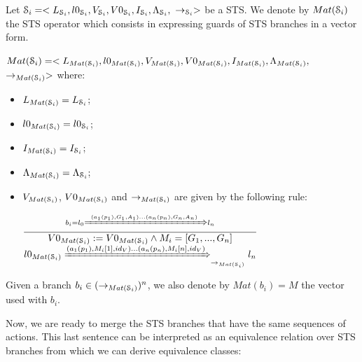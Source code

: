 \begin{definition}
\label{rule:matrix}
  Let $\EuScript{S}_i=<L_{\EuScript{S}_i},l0_{\EuScript{S}_i},V_{\EuScript{S}_i},V0_{\EuScript{S}_i},I_{\EuScript{S}_i},\Lambda_{\EuScript{S}_i},$
  $\rightarrow_{\EuScript{S}_i}>$ be a STS. We denote by
  $Mat(\EuScript{S}_i)$ the STS operator which consists in
  expressing guards of STS branches in a vector form.

  $Mat(\EuScript{S}_i)=<L_{Mat(\EuScript{S}_i)},l0_{Mat(\EuScript{S}_i)},V_{Mat(\EuScript{S}_i)},V0_{Mat(\EuScript{S}_i)},I_{Mat(\EuScript{S}_i)},\Lambda_{Mat(\EuScript{S}_i)},$
  $\rightarrow_{Mat(\EuScript{S}_i)}>$ where:

	\begin{itemize}
    \item $L_{Mat(\EuScript{S}_i)}=L_{\EuScript{S}_i}$;
    \item $l0_{Mat(\EuScript{S}_i)}=l0_{\EuScript{S}_i}$;
    \item $I_{Mat(\EuScript{S}_i)}=I_{\EuScript{S}_i}$;
    \item $\Lambda_{Mat(\EuScript{S}_i)} = \Lambda_{\EuScript{S}_i}$;

    \item $V_{Mat(\EuScript{S}_i)}$, $V0_{Mat(\EuScript{S}_i)}$
      and $\rightarrow_{Mat(\EuScript{S}_i)}$ are given by the
      following rule:

    \begin{center}
    {\Large
    $\frac{b_i=l_0 \xRightarrow{(a_1(p_1),G_1,A_1)...(a_n(p_n),G_n,A_n)} l_n}{
      \begin{matrix}
        V0_{Mat(\EuScript{S}_i)}:=V0_{Mat(\EuScript{S}_i)} \wedge M_{i}=[G_1,...,G_n]\\
        l0_{Mat(\EuScript{S}_i)} \xRightarrow{(a_1(p_1),M_i[1],id_V) ...(a_n(p_n),M_i[n],id_V) }_{\rightarrow_{Mat(\EuScript{S}_i)}} l_n\\
      \end{matrix}
    }$
    }
    \end{center}
  \end{itemize}

  Given a branch $b_i \in (\rightarrow_{Mat(\EuScript{S}_i)})^n$,
  we also denote by $Mat(b_i)=M$ the vector used with $b_i$.
\end{definition}

Now, we are ready to merge the STS branches that have the same
sequences of actions. This last sentence can be interpreted as an
equivalence relation over STS branches from which we can derive
equivalence classes:

